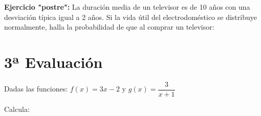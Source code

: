 \documentclass[addpoints,spanish, 12pt,a4paper]{exam}
\begin{document}
\begin{questions}
\question \textbf{Ejercicio "postre":} La duración media de un televisor es de 10 años con una desviación típica igual a 2 años. Si la
vida útil del electrodoméstico se distribuye normalmente, halla la probabilidad de que al comprar
un televisor: 
    
        


        
        
        
\section*{3ª Evaluación}    

\question[1] Dadas las funciones: $f(x)=3x-2$ y $g(x)=\dfrac{3}{x+1}$
\begin{multicols}{1}

\end{multicols}        
        
    
        \question[1] Calcula: 
        \begin{multicols}{2}
\end{multicols}
\end{questions}
\end{document}
